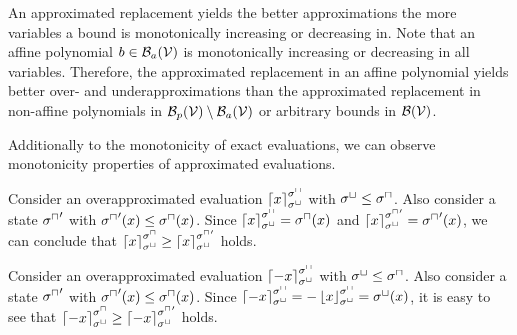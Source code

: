 An approximated replacement yields the better approximations the more variables a bound is monotonically increasing or decreasing in.
Note that an affine polynomial $b \in \mathcal{B}_a(\mathcal{V})$ is monotonically increasing or decreasing in all variables.
Therefore, the approximated replacement in an affine polynomial yields better over- and underapproximations than the approximated replacement in non-affine polynomials in $\mathcal{B}_p(\mathcal{V}) \setminus \mathcal{B}_a(\mathcal{V})$ or arbitrary bounds in $\mathcal{B}(\mathcal{V})$.

Additionally to the monotonicity of exact evaluations, we can observe monotonicity properties of approximated evaluations.



\begin{example}
  Consider an overapproximated evaluation $\left\lceil x \right\rceil^{{\sigma^\sqcap}}_{{\sigma^\sqcup}}$ with ${\sigma^\sqcup} \leq {\sigma^\sqcap}$.
  Also consider a state ${\sigma^\sqcap}'$ with ${\sigma^\sqcap}'(x) \leq {\sigma^\sqcap}(x)$.
  Since $\left\lceil x \right\rceil^{{\sigma^\sqcap}}_{{\sigma^\sqcup}} = {\sigma^\sqcap}(x)$ and $\left\lceil x \right\rceil^{{\sigma^\sqcap}'}_{{\sigma^\sqcup}} = {\sigma^\sqcap}'(x)$, we can conclude that $\left\lceil x \right\rceil^{{\sigma^\sqcap}}_{{\sigma^\sqcup}} \geq \left\lceil x \right\rceil^{{\sigma^\sqcap}'}_{{\sigma^\sqcup}}$ holds.

  Consider an overapproximated evaluation $\left\lceil -x \right\rceil^{{\sigma^\sqcap}}_{{\sigma^\sqcup}}$ with ${\sigma^\sqcup} \leq {\sigma^\sqcap}$.
  Also consider a state ${\sigma^\sqcap}'$ with ${\sigma^\sqcap}'(x) \leq {\sigma^\sqcap}(x)$.
  Since $\left\lceil -x \right\rceil^{{\sigma^\sqcap}}_{{\sigma^\sqcup}} = -\left\lfloor x \right\rfloor^{{\sigma^\sqcap}}_{{\sigma^\sqcup}} = {\sigma^\sqcup}(x)$, it is easy to see that $\left\lceil -x \right\rceil^{{\sigma^\sqcap}}_{{\sigma^\sqcup}} \geq \left\lceil -x \right\rceil^{{\sigma^\sqcap}'}_{{\sigma^\sqcup}}$ holds.
\end{example}
